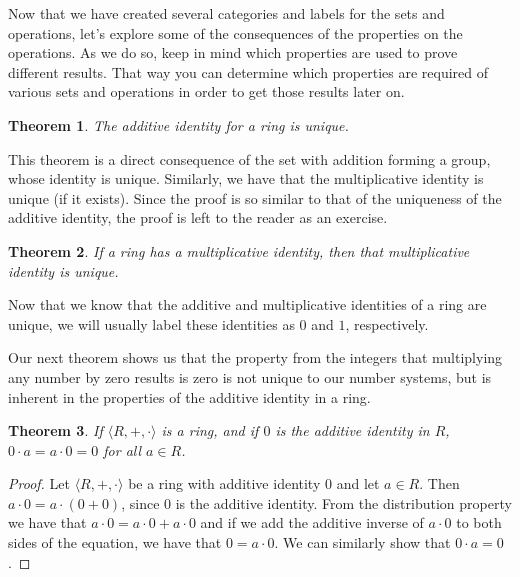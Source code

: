 \documentclass[
]{book}
\newtheorem{theorem}{Theorem}[chapter]
\theoremstyle{definition}
\theoremstyle{definition}
\theoremstyle{definition}
\theoremstyle{definition}
\theoremstyle{remark}
\begin{document}
Now that we have created several categories and labels for the sets and operations, let's explore some of the consequences of the properties on the operations. As we do so, keep in mind which properties are used to prove different results. That way you can determine which properties are required of various sets and operations in order to get those results later on.

\begin{theorem}
The additive identity for a ring is unique.
\end{theorem}

This theorem is a direct consequence of the set with addition forming a group, whose identity is unique. Similarly, we have that the multiplicative identity is unique (if it exists). Since the proof is so similar to that of the uniqueness of the additive identity, the proof is left to the reader as an exercise.

\begin{theorem}
\protect\hypertarget{thm:multiplicative-identity}{}\label{thm:multiplicative-identity}If a ring has a multiplicative identity, then that multiplicative identity is unique.
\end{theorem}

Now that we know that the additive and multiplicative identities of a ring are unique, we will usually label these identities as \(0\) and \(1\), respectively.

Our next theorem shows us that the property from the integers that multiplying any number by zero results is zero is not unique to our number systems, but is inherent in the properties of the additive identity in a ring.

\begin{theorem}
\protect\hypertarget{thm:zero-multiplication}{}\label{thm:zero-multiplication}If \(\langle R,+,\cdot\rangle\) is a ring, and if \(0\) is the additive identity in \(R\), \(0\cdot a=a\cdot 0=0\) for all \(a\in R\).
\end{theorem}

\begin{proof}
Let \(\langle R,+,\cdot\rangle\) be a ring with additive identity \(0\) and let \(a\in R\). Then \(a \cdot 0 = a \cdot (0+0)\), since \(0\) is the additive identity. From the distribution property we have that \(a \cdot 0 = a \cdot 0 + a \cdot 0\) and if we add the additive inverse of \(a \cdot 0\) to both sides of the equation, we have that \(0=a\cdot 0\). We can similarly show that \(0\cdot a=0\).
\end{proof}
\end{document}
